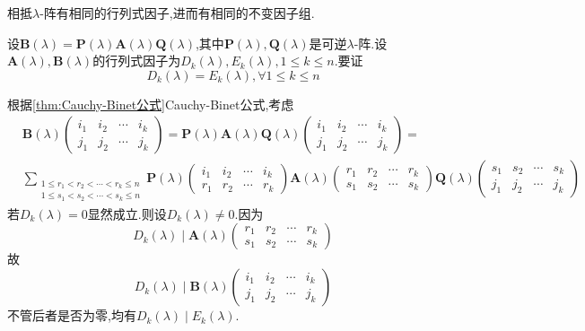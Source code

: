 \begin{formal}
\begin{theorem}[相抵的不变因子组]\label{thm:相抵的不变因子组}
   相抵$\lambda$-阵有相同的行列式因子,进而有相同的不变因子组.
\end{theorem}
\begin{Proof}
设$\bm{B}\left(\lambda\right)=\bm{P}\left(\lambda\right)\bm{A}\left(\lambda\right)\bm{Q}\left(\lambda\right)$,其中$\bm{P}\left(\lambda\right),\bm{Q}\left(\lambda\right)$是可逆$\lambda$-阵.设$\bm{A}\left(\lambda\right),\bm{B}\left(\lambda\right)$的行列式因子为$D_k\left(\lambda\right),E_k\left(\lambda\right),1\leqslant k\leqslant n.$要证
\[
D_k\left(\lambda\right)=E_k\left(\lambda\right),\forall 1\leqslant k\leqslant n
\]

根据\cref{thm:Cauchy-Binet公式}\textup{Cauchy-Binet}公式,考虑
\begin{align*}
   & \bm{B}\left(\lambda\right)\begin{pmatrix}
        i_1&i_2&\cdots&i_k\\
        j_1&j_2&\cdots&j_k
    \end{pmatrix}=
    \bm{P}\left(\lambda\right)\bm{A}\left(\lambda\right)\bm{Q}\left(\lambda\right)\begin{pmatrix}
        i_1&i_2&\cdots&i_k\\
        j_1&j_2&\cdots&j_k
    \end{pmatrix}=\\
    &\sum_{
        \begin{smallmatrix}
            1\leqslant r_1<r_2<\cdots<r_k\leqslant n\\
            1\leqslant s_1<s_2<\cdots<s_k\leqslant n
        \end{smallmatrix}
    }\bm{P}\left(\lambda\right)\begin{pmatrix}
        i_1&i_2&\cdots&i_k\\
        r_1&r_2&\cdots&r_k
    \end{pmatrix}
    \bm{A}\left(\lambda\right)\begin{pmatrix}
        r_1&r_2&\cdots&r_k\\
        s_1&s_2&\cdots&s_k
    \end{pmatrix}
    \bm{Q}\left(\lambda\right)\begin{pmatrix}
        s_1&s_2&\cdots&s_k\\
        j_1&j_2&\cdots&j_k
    \end{pmatrix}
\end{align*}
若$D_k\left(\lambda\right)=0$显然成立.则设$D_k\left(\lambda\right)\neq 0.$因为
\[
D_k\left(\lambda\right)\mid \bm{A}\left(\lambda\right)\begin{pmatrix}
    r_1&r_2&\cdots&r_k\\
    s_1&s_2&\cdots&s_k
\end{pmatrix}
\]故
\[
D_k\left(\lambda\right)\mid \bm{B}\left(\lambda\right)\begin{pmatrix}
    i_1&i_2&\cdots&i_k\\
    j_1&j_2&\cdots&j_k
\end{pmatrix}
\]不管后者是否为零,均有$D_k\left(\lambda\right)\mid E_k\left(\lambda\right)$.


\end{Proof}
\end{formal}
